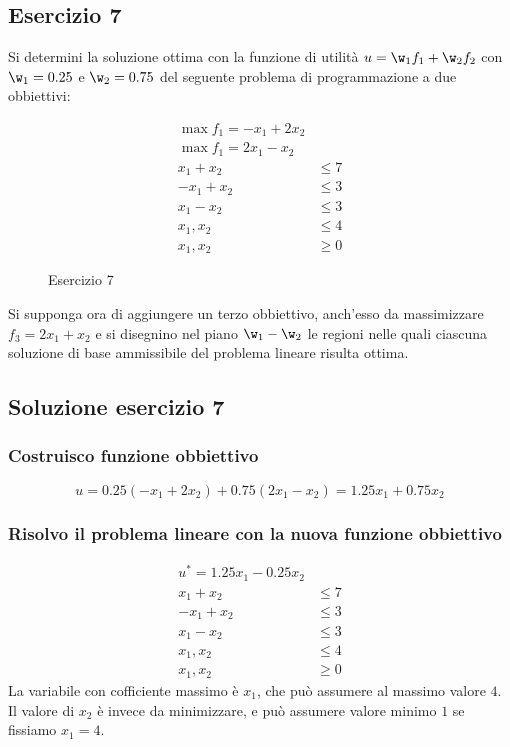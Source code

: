 \documentclass[\main/main.tex]{subfiles}
\begin{document}
\subsection{Esercizio 7}
Si determini la soluzione ottima con la funzione di utilità $u = \w_1f_1 + \w_2f_2$ con $\w_1 = 0.25$ e $\w_2 = 0.75$ del seguente problema di programmazione a due obbiettivi:

\begin{figure}
  \begin{align*}
    \max f_1 = -x_1 + 2x_2 \\
    \max f_1 = 2x_1 - x_2  \\
    x_1 + x_2  & \leq 7    \\
    -x_1 + x_2 & \leq 3    \\
    x_1 - x_2  & \leq 3    \\
    x_1, x_2   & \leq 4    \\
    x_1, x_2   & \geq 0
  \end{align*}
  \caption{Esercizio 7}
\end{figure}

Si supponga ora di aggiungere un terzo obbiettivo, anch'esso da massimizzare $f_3 = 2x_1 + x_2$ e si disegnino nel piano $\w_1-\w_2$ le regioni nelle quali ciascuna soluzione di base ammissibile del problema lineare risulta ottima.

\subsection{Soluzione esercizio 7}

\subsubsection*{Costruisco funzione obbiettivo}

\[
  u = 0.25(-x_1 + 2x_2) + 0.75(2x_1-x_2) = 1.25x_1 + 0.75x_2
\]
\subsubsection*{Risolvo il problema lineare con la nuova funzione obbiettivo}

\begin{align*}
  u^* = 1.25x_1 - 0.25x_2 \\
  x_1 + x_2  & \leq 7     \\
  -x_1 + x_2 & \leq 3     \\
  x_1 - x_2  & \leq 3     \\
  x_1, x_2   & \leq 4     \\
  x_1, x_2   & \geq 0
\end{align*}
La variabile con cofficiente massimo è $x_1$, che può assumere al massimo valore $4$. Il valore di $x_2$ è invece da minimizzare, e può assumere valore minimo $1$ se fissiamo $x_1=4$.
\end{document}
